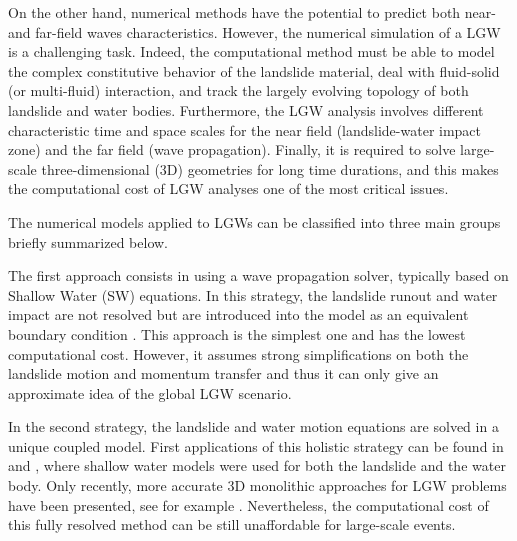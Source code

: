 On the other hand, numerical methods have the potential to predict both near- and far-field waves characteristics. However, the numerical simulation of a LGW is a challenging task. Indeed, the computational method must be able to model the complex constitutive behavior of the landslide material, deal with fluid-solid (or multi-fluid) interaction, and track the largely evolving topology of both landslide and water bodies. Furthermore, the LGW analysis involves different characteristic time and space scales for the near field (landslide-water impact zone) and the far field (wave propagation). Finally, it is required to solve large-scale three-dimensional (3D) geometries for long time durations, and this makes the computational cost of LGW analyses one of the most critical issues.

The numerical models applied to LGWs can be classified into three main groups \cite{yavari2016numerical} briefly summarized below.

The first approach consists in using a wave propagation solver, typically based on Shallow Water (SW) equations. In this strategy, the landslide runout and water impact are not resolved but are introduced into the model as an equivalent boundary condition \cite{waythomas2003numerical, ataie2008mapping}. This approach is the simplest one and has the lowest computational cost. However, it assumes strong simplifications on both the landslide motion and momentum transfer and thus it can only give an approximate idea of the global LGW scenario.

In the second strategy, the landslide and water motion equations are solved in a unique coupled model. First applications of this holistic strategy can be found in \cite{kelfoun2010landslide} and \cite{giachetti2011numerical}, where shallow water models were used for both the landslide and the water body.
Only recently, more accurate 3D monolithic approaches for LGW problems have been presented, see for example
\cite{vacondio20133d, CrostaVajont, franci20203dA, franci20203dB, xu2021sph, terada2021}. Nevertheless, the computational cost of this fully resolved method can be still unaffordable for large-scale events.

